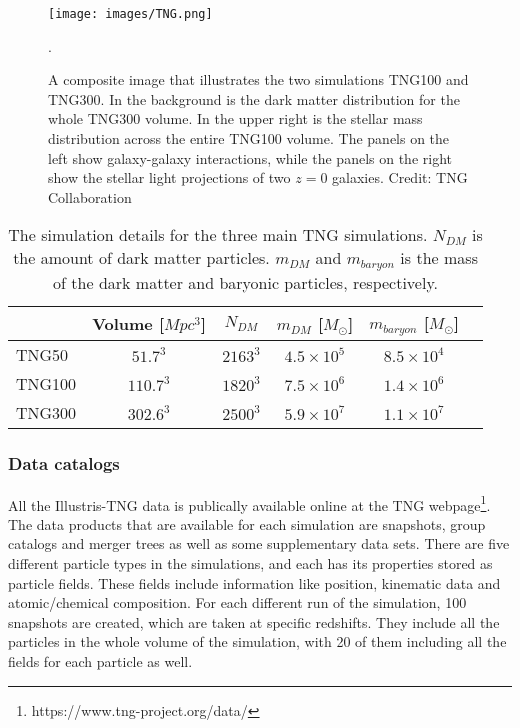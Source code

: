 \begin{figure}
    \centering
    \texttt{[image: images/TNG.png]}
    \caption{A composite image that illustrates the two simulations TNG100 and TNG300. In the background is the dark matter distribution for the whole TNG300 volume. In the upper right is the stellar mass distribution across the entire TNG100 volume. The panels on the left show galaxy-galaxy interactions, while the panels on the right show the stellar light projections of two $z=0$ galaxies. Credit: TNG Collaboration}.
    \label{tng_illustration}
\end{figure}

\begin{table}
\begin{center}
\caption{The simulation details for the three main TNG simulations. $N_{DM}$ is the amount of dark matter particles. $m_{DM}$ and $m_{baryon}$ is the mass of the dark matter and baryonic particles, respectively.}
 \label{TNG}
\begin{tabular}{ l| c c c c c } 
 \hline
 \hline
   &  Volume [$Mpc^3$] & $N_{DM}$ & $m_{DM}$ [$M_{\odot}$] & $m_{baryon}$ [$M_{\odot}$] \\
 \hline
 TNG50 & $51.7^3$ & $2163^3$ & $4.5 \times 10^5 $ & $8.5 \times 10^4 $ \\ 
 TNG100 & $110.7^3$ & $1820^3$ & $7.5 \times 10^6 $ & $1.4 \times 10^6 $  \\ 
 TNG300 & $302.6^3$ & $2500^3$ & $5.9 \times 10^7 $ & $1.1 \times 10^7 $  \\ 
 \hline 
 \end{tabular}
\end{center}
\end{table}

\subsubsection{Data catalogs}
All the Illustris-TNG data is publically available online at the TNG webpage\footnote{https://www.tng-project.org/data/}. The data products that are available for each simulation are snapshots, group catalogs and merger trees as well as some supplementary data sets. There are five different particle types in the simulations, and each has its properties stored as particle fields. These fields include information like position, kinematic data and atomic/chemical composition. For each different run of the simulation, 100 snapshots are created, which are taken at specific redshifts. They include all the particles in the whole volume of the simulation, with 20 of them including all the fields for each particle as well.

